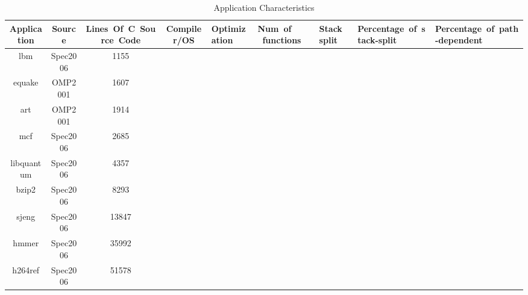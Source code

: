 
\begin{table*}[!t]
\begin{scriptsize}
\centering
\vspace{-5ex}
\begin{tabular}{|c|c|c|c|} %
\hline
\textbf{Application}&\textbf{Source}&\textbf{Lines\ Of\ C\ Source\ Code}&\textbf{Compiler/OS}&\textbf{Optimization}&\textbf{Num\ of \ functions}&\textbf{Stack split}&\textbf{Percentage\ of\ stack-split}&\textbf{Percentage\ of\ path-dependent}\\ \hline%



lbm&Spec2006&1155  \\\hline
equake&OMP2001&1607  \\\hline
art&OMP2001&1914  \\\hline
mcf&Spec2006&2685  \\\hline
libquantum&Spec2006&4357 \\\hline
bzip2&Spec2006&8293 \\\hline
sjeng&Spec2006&13847 \\\hline
hmmer&Spec2006&35992 \\\hline
h264ref&Spec2006&51578 \\\hline

\end{tabular}
\vspace{-2ex}
\caption{Application Characteristics}
\vspace{-4ex}
\label{tab:app-characteristics}
\end{scriptsize}
\end{table*}

